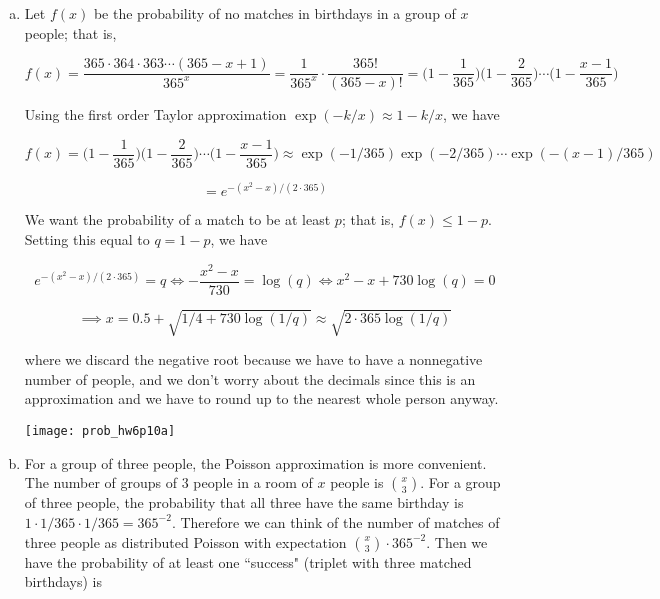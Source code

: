 \begin{enumerate}[(a)]

\item Let \(f(x)\) be the probability of no matches in birthdays in a group of \(x\) people; that is, 

\[
f(x) = \frac{365 \cdot 364 \cdot 363 \cdots (365 - x + 1)}{365^x} = \frac{1}{365^x} \cdot \frac{365!}{(365 - x)!} = \bigg( 1 - \frac{1}{365} \bigg) \bigg(1 - \frac{2}{365} \bigg) \cdots \bigg( 1 - \frac{x-1}{365}\bigg) 
\]

Using the first order Taylor approximation \(\exp(-k/x) \approx 1 - k/x\), we have

\[
f(x) = \bigg( 1 - \frac{1}{365} \bigg) \bigg(1 - \frac{2}{365} \bigg) \cdots \bigg( 1 - \frac{x-1}{365}\bigg)  \approx \exp(-1/365) \exp(-2/365) \cdots \exp(-(x-1)/365) 
\]

\[
= e^{-(x^2 - x)/(2\cdot 365)}
\]

We want the probability of a match to be at least \(p\); that is, \(f(x) \leq 1 - p\). Setting this equal to \(q = 1 - p\), we have

\[
e^{-(x^2 - x)/(2\cdot 365)} = q \iff -\frac{x^2 - x}{730} = \log(q) \iff x^2 - x + 730 \log(q) = 0 
\]

\[
\implies x = 0.5 + \sqrt{1/4 + 730 \log(1/q)} \approx \boxed{ \sqrt{2 \cdot 365 \log(1/q)}}
\]

where we discard the negative root because we have to have a nonnegative number of people, and we don't worry about the decimals since this is an approximation and we have to round up to the nearest whole person anyway.

\texttt{[image: prob\_hw6p10a]}

%
%



\item For a group of three people, the Poisson approximation is more convenient. The number of groups of 3 people in a room of \(x\) people is \(\binom{x}{3}\). For a group of three people, the probability that all three have the same birthday is \(1 \cdot 1/365 \cdot 1/365 = 365^{-2}\). Therefore we can think of the number of matches of three people as distributed Poisson with expectation \(\binom{x}{3} \cdot 365^{-2}\). Then we have the probability of at least one ``success" (triplet with three matched birthdays) is


\end{enumerate}
